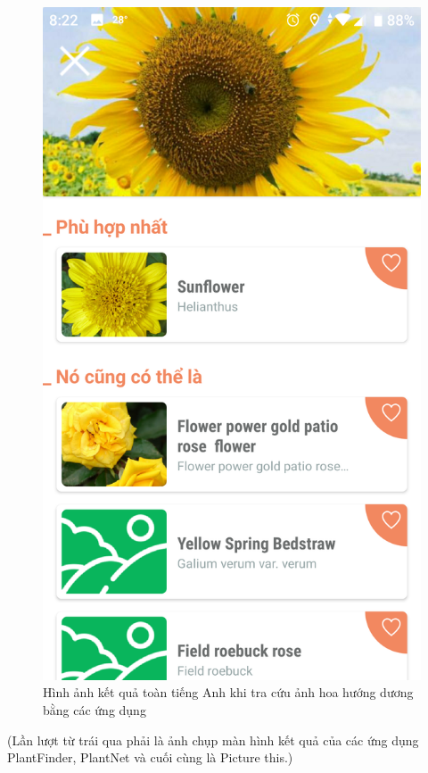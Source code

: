 \documentclass[12pt]{report}
\begin{document}
\begin{figure}[h]
			\includegraphics[scale=0.13]{app_en_3}
			\caption{Hình ảnh kết quả toàn tiếng Anh khi tra cứu ảnh hoa hướng dương bằng các ứng dụng}
			\label{fig:app_en}
		\end{figure}
		(Lần lượt từ trái qua phải là ảnh chụp màn hình kết quả của các ứng dụng PlantFinder, PlantNet và cuối cùng là Picture this.)
																				
\end{document}
